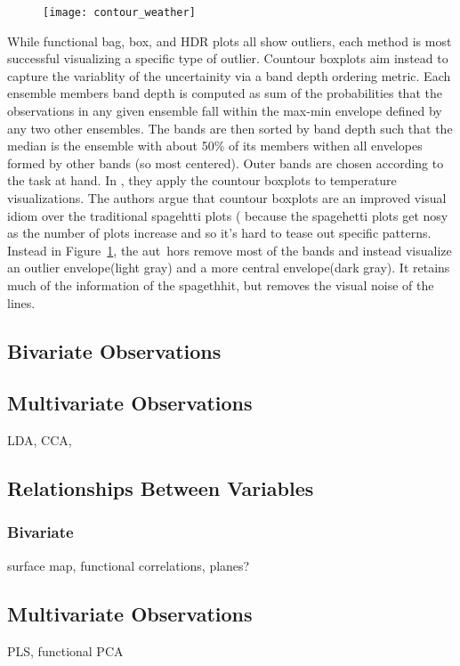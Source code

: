 \documentclass[../main.tex]{subfiles}
\begin{document}
\begin{figure}
  \texttt{[image: contour\_weather]}
  \caption{\label{fig:countour}}
\end{figure}
While functional bag, box, and HDR plots all show outliers, each method is most
successful visualizing a specific type of outlier. Countour
boxplots\cite{whitaker2013} aim instead to capture the variablity of the
uncertainity via a band depth ordering metric. Each ensemble members band depth
is computed as sum of the probabilities that the observations in any given
ensemble fall within the max-min envelope defined by any two other
ensembles. The bands are then sorted by band depth such that the median is the
ensemble with about 50\% of its members withen all envelopes formed by other
bands (so most centered). Outer bands are chosen according to the task at
hand. In \cite{whitaker2013}, they apply the countour boxplots to temperature
visualizations. The authors argue that countour boxplots are an improved visual
idiom over the traditional spagehtti plots (%
because the spagehetti plots get nosy as the number of plots increase
and so it's hard to tease out specific patterns. Instead in
Figure~\ref{fig:countour}, the aut\
hors
remove most of the bands and instead visualize an outlier envelope(light gray)
and a more central envelope(dark gray). It retains much of the information of
the spagethhit, but removes the visual noise of the lines.



\subsection{Bivariate Observations}

\subsection{Multivariate Observations}
LDA, CCA, 
\subsection{Relationships Between Variables}

\subsubsection{Bivariate}
surface map, functional correlations, planes?
\subsection{Multivariate Observations}
PLS, functional PCA
\end{document}
